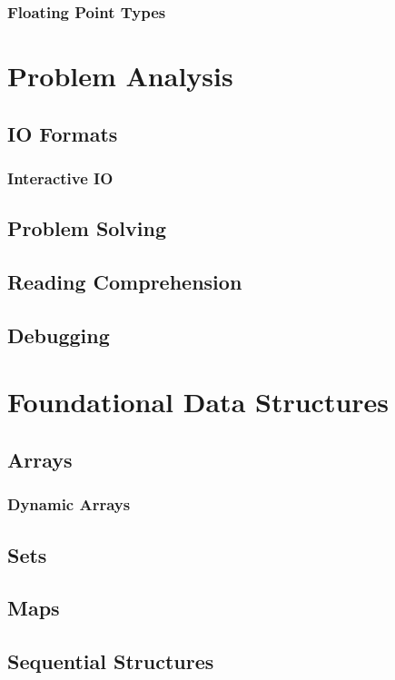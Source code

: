 \documentclass[12pt]{article}
\begin{document}
\subsubsection{Floating Point Types}

\hspace{0mm}

\section{Problem Analysis}
\subsection{IO Formats}
\subsubsection{Interactive IO}
\subsection{Problem Solving}
\subsection{Reading Comprehension}
\subsection{Debugging}

\hspace{0mm}

\section{Foundational Data Structures}
\subsection{Arrays}
\subsubsection{Dynamic Arrays}
\subsection{Sets}
\subsection{Maps}
\subsection{Sequential Structures}
\end{document}
